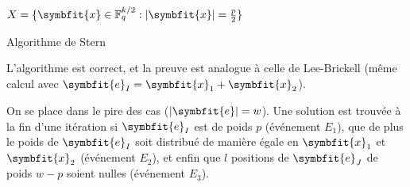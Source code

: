 \documentclass{scrartcl}[a4paper,9pt,headings=small,footinclude=false]
\theoremstyle{definition}
\theoremstyle{remark}
\begin{document}
\begin{algorithm}[H]
    \renewcommand{\algorithmcfname}{Algorithme}%
    \SetAlgoLined
    $X=\{ \symbfit{x}\in\mathbb{F}_q^{k/2} :|\symbfit{x}| =\frac{p}{2} \}$
    
\caption{Algorithme de Stern}
\end{algorithm}

L'algorithme est correct, et la preuve est analogue à celle de Lee-Brickell (même calcul avec $\symbfit{e}_I=\symbfit{x}_1+\symbfit{x}_2$).

On se place dans le pire des cas ($|\symbfit{e}|=w$).
Une solution est trouvée à la fin d'une itération si $\symbfit{e}_I$ est de poids $p$ (événement $E_1$), que de plus le poids de $\symbfit{e}_I$ soit distribué de manière égale en $\symbfit{x}_1$ et $\symbfit{x}_2$ (événement $E_2$), et enfin que $l$ positions de $\symbfit{e}_J$ de poids $w-p$ soient nulles (événement $E_3$).
\end{document}
